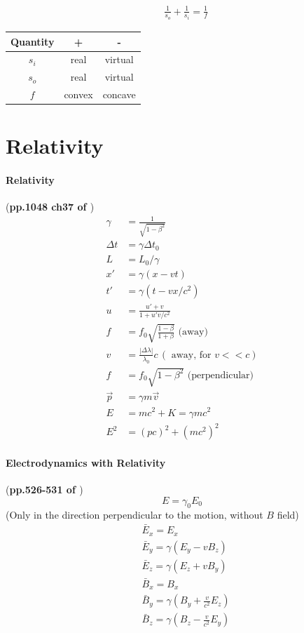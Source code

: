 \documentclass{article}
\numberwithin{equation}{subsection} %
\theoremstyle{definition}
\begin{document}
\begin{align}
    & \frac{1}{s_o} + \frac{1}{s_i} = \frac{1}{f}
\end{align}
\begin{table}[H]
    \centering
    \begin{tabular}{c c c}
        Quantity & + & -\\
        \hline
        $s_i$ & real & virtual \\
        \hline
        $s_o$ & real & virtual \\
        \hline
        $f$ & convex & concave \\
        \hline
    \end{tabular}
\end{table}
\section{Relativity}
\label{sec:Relativity}

\paragraph{Relativity} (\textbf{pp.1048 ch37 of \cite{book}})
\begin{align}
    \gamma &= \frac{1}{\sqrt{1-\beta^2}} \\
    \Delta t &= \gamma \Delta t_0 \\
    L &= L_0/\gamma \\
    x' &= \gamma(x-vt) \\
    t' &= \gamma(t-vx/c^2) \\
    u &= \frac{u'+v}{1+u'v/c^2} \\
    f &= f_0 \sqrt{\frac{1-\beta}{1+\beta}}\text{ (away)} \\
    v &= \frac{|\Delta\lambda|}{\lambda_0}c\,( \text{ away, for } v<<c) \\
    f &= f_0 \sqrt{1-\beta^2} \text{ (perpendicular)}\\
    \vec{p} &= \gamma m \vec{v} \\
    E &= mc^2 + K = \gamma mc^2 \\
    E^2 &= (pc)^2 + (mc^2)^2
\end{align}

\paragraph{Electrodynamics with Relativity} (\textbf{pp.526-531 of
\cite{Griffiths_electrod}})
\begin{equation}
    E = \gamma_0 E_0
\end{equation}
    (Only in the direction perpendicular to
    the motion, without $B$ field)
\begin{align}
    & \bar{E}_x = E_x \\
    & \bar{E}_y = \gamma(E_y - v B_z) \\
    & \bar{E}_z = \gamma(E_z + v B_y) \\
    & \bar{B}_x = B_x \\
    & \bar{B}_y = \gamma(B_y + \frac{v}{c^2} E_z) \\
    & \bar{B}_z = \gamma(B_z - \frac{v}{c^2} E_y)
\end{align}
\end{document}
